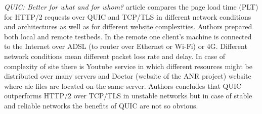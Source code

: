 \textit{QUIC: Better for what and for whom?} article \cite{quic-better-for-what-and-for-whom} compares the page load time (PLT) for HTTP/2 requests over QUIC and TCP/TLS in different network conditions and architectures as well as for different website complexities.
Authors prepared both local and remote testbeds.
In the remote one client's machine is connected to the Internet over ADSL (to router over Ethernet or Wi-Fi) or 4G.
Different network conditions mean different packet loss rate and delay.
In case of complexity of site there is Youtube service in which different resources might be distributed over many servers and Doctor (website of the ANR project) website where ale files are located on the same server.
Authors concludes that QUIC outperforms HTTP/2 over TCP/TLS in unstable networks but in case of stable and reliable networks the benefits of QUIC are not so obvious.

